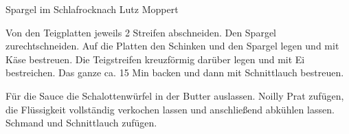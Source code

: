 \begin{recipe}{Spargel im Schlafrock}{nach Lutz Moppert}

  
  \steps
  Von den Teigplatten jeweils 2 Streifen abschneiden. Den Spargel zurechtschneiden. Auf 
  die Platten den Schinken und den Spargel legen und mit Käse bestreuen. Die Teigstreifen 
  kreuzförmig darüber legen und mit Ei bestreichen. Das ganze ca. 15 Min backen und dann 
  mit Schnittlauch bestreuen.
  
  Für die Sauce die Schalottenwürfel in der Butter auslassen. Noilly Prat zufügen, die
  Flüssigkeit vollständig verkochen lassen und anschließend abkühlen lassen. Schmand und 
  Schnittlauch zufügen.
\end{recipe}
